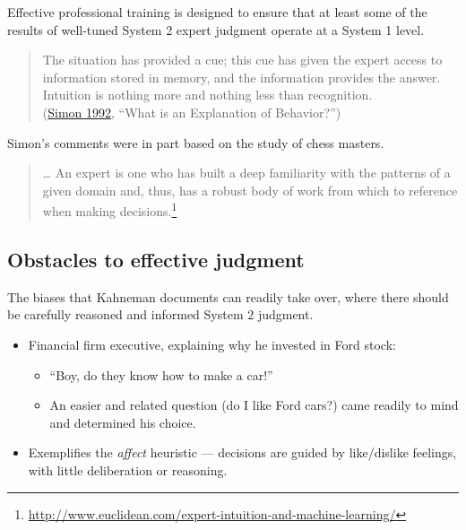 \documentclass[
  10pt,
  b5paper]{book}
\providecommand{\tightlist}{%
  \setlength{\itemsep}{0pt}\setlength{\parskip}{0pt}}
\begin{document}
Effective professional training is designed to ensure that at least
some of the results of well-tuned System 2 expert judgment operate
at a System 1 level.

\begin{quote}
The situation has provided a cue; this cue has given the expert access to information stored in memory, and the information provides the answer. Intuition is nothing more and nothing less than recognition.\\
(\protect\hyperlink{ref-simon1992explanation}{Simon 1992}, {``What is an Explanation of Behavior?''})
\end{quote}

Simon's comments were in part based on the study of chess masters.

\begin{quote}
\ldots{} An expert is one who has built a deep familiarity with the patterns of a given domain and, thus, has a robust body of work from which to reference when making decisions.\footnote{
  \url{http://www.euclidean.com/expert-intuition-and-machine-learning/}}
\end{quote}

\hypertarget{obstacles-to-effective-judgment}{%
\subsection*{Obstacles to effective judgment}\label{obstacles-to-effective-judgment}}

The biases that Kahneman documents can readily take over, where
there should be carefully reasoned and informed System 2 judgment.

\begin{itemize}
\tightlist
\item
  Financial firm executive, explaining why he invested in Ford stock:

  \begin{itemize}
  \tightlist
  \item
    ``Boy, do they know how to make a car!''
  \item
    An easier and related question (do I like Ford cars?) came
    readily to mind and determined his choice.
  \end{itemize}
\item
  Exemplifies the \emph{affect} heuristic --- decisions are guided
  by like/dislike feelings, with little deliberation or reasoning.
\end{itemize}
\end{document}
